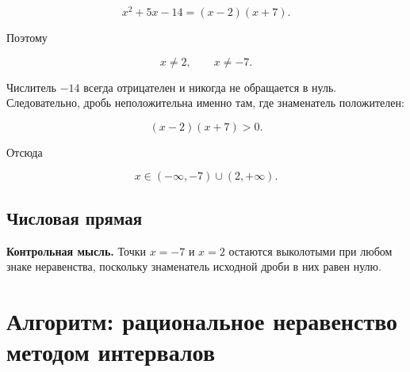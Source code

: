 \documentclass[a4paper,12pt]{article}
\begin{document}
\[
x^2+5x-14=(x-2)(x+7).
\]

Поэтому

\[
x\ne2,
\qquad
x\ne-7.
\]

Числитель $-14$ всегда отрицателен и никогда не обращается в нуль.
Следовательно, дробь неположительна именно там, где знаменатель
положителен:

\[
(x-2)(x+7)>0.
\]

Отсюда

\[
\boxed{
x\in(-\infty,-7)\cup(2,+\infty)
}.
\]

\subsection*{Числовая прямая}

\begin{center}
\end{center}

\textbf{Контрольная мысль.}
Точки $x=-7$ и $x=2$ остаются выколотыми при любом знаке
неравенства, поскольку знаменатель исходной дроби в них равен нулю.


\clearpage

\section*{Алгоритм: рациональное неравенство методом интервалов}
\end{document}
